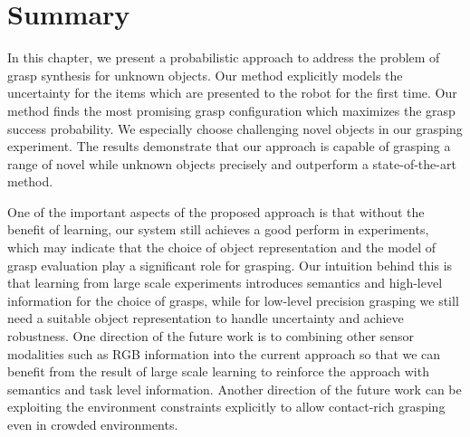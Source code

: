 \section{Summary}
In this chapter, we present a probabilistic approach to address the problem of grasp synthesis for unknown objects. Our method explicitly models the uncertainty for the items which are presented to the robot for the first time. Our method finds the most promising grasp configuration which maximizes the grasp success probability. We especially choose challenging novel objects in our grasping experiment. The results demonstrate that our approach is capable of grasping a range of novel while unknown objects precisely and outperform a state-of-the-art method.

One of the important aspects of the proposed approach is that without the benefit of learning, our system still achieves a good perform in experiments, which may indicate that the choice of object representation and the model of grasp evaluation play a significant role for grasping. Our intuition behind this is that learning from large scale experiments introduces semantics and high-level information for the choice of grasps, while for low-level precision grasping we still need a suitable object representation to handle uncertainty and achieve robustness. One direction of the future work is to combining other sensor modalities such as RGB information into the current approach so that we can benefit from
 the result of large scale learning to reinforce the approach with semantics and task level information. Another direction of the future work can be exploiting the environment constraints explicitly to allow contact-rich grasping even in crowded environments.




